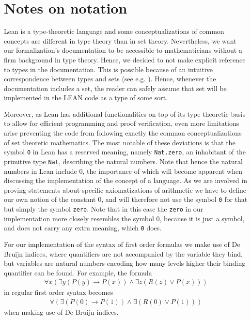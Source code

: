 \chapter{Notes on notation}
Lean is a type-theoretic language and some conceptualizations of common concepts are different in type theory than in set theory. Nevertheless, we want our formalization's documentation to be accessible to mathematicians without a firm background in type theory. Hence, we decided to not make explicit reference to types in the documentation. This is possible because of an intuitive correspondence between types and sets (see e.g. \cite{nederpelt1994}). Hence, whenever the documentation includes a set, the reader can safely assume that set will be implemented in the LEAN code as a type of some sort. 

Moreover, as Lean has additional functionalities on top of its type theoretic basis to allow for efficient programming and proof verification, even more limitations arise preventing the code from following exactly the common conceptualizations of set theoretic mathematics. The most notable of these deviations is that the symbol \lstinline{0} in Lean has a reserved meaning, namely \lstinline{Nat.zero}, an inhabitant of the primitive type \lstinline{Nat}, describing the natural numbers. Note that hence the natural numbers in Lean include 0, the importance of which will become apparent when discussing the implementation of the concept of a language. As we are involved in proving statements about specific axiomatizations of arithmetic we have to define our own notion of the constant 0, and will therefore not use the symbol \lstinline{0} for that but simply the symbol \lstinline{zero}. Note that in this case the \lstinline{zero} in our implementation more closely resembles the symbol 0, because it is just a symbol, and does not carry any extra meaning, which \lstinline{0} does.

For our implementation of the syntax of first order formulas we make use of De Bruijn indices, where quantifiers are not accompanied by the variable they bind, but variables are natural numbers encoding how many levels higher their binding quantifier can be found. For example, the formula 
\begin{align*}
    \forall x (\exists y (P(y) \to P(x)) \land \exists z(R(z) \lor P(x)))
\end{align*}
in regular first order syntax becomes
\begin{align*}
    \forall (\exists (P(0) \to P(1)) \land \exists (R(0) \lor P(1)))
\end{align*}
when making use of De Bruijn indices.
